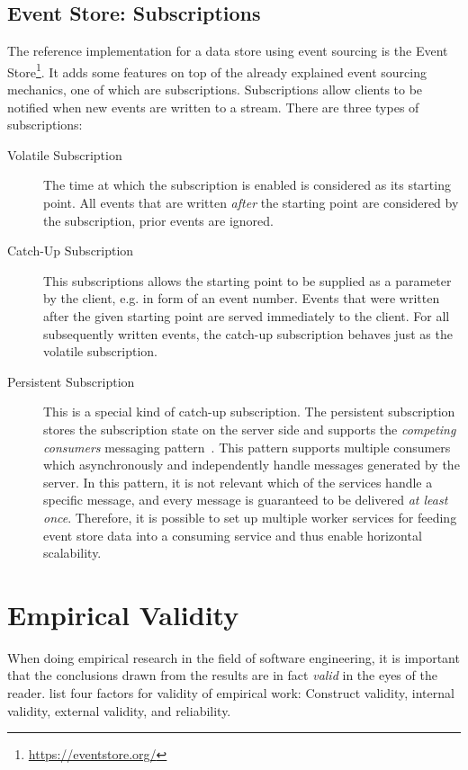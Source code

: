 \subsection{Event Store: Subscriptions}

The reference implementation for a data store using event sourcing is the Event Store\footnote{\url{https://eventstore.org/}}.
It adds some features on top of the already explained event sourcing mechanics, one of which are subscriptions.
Subscriptions allow clients to be notified when new events are written to a stream.
There are three types of subscriptions:

\begin{description}
\item[Volatile Subscription]
The time at which the subscription is enabled is considered as its starting point.
All events that are written \emph{after} the starting point are considered by the subscription, prior events are ignored.
\item[Catch-Up Subscription]
This subscriptions allows the starting point to be supplied as a parameter by the client, e.g. in form of an event number.
Events that were written after the given starting point are served immediately to the client.
For all subsequently written events, the catch-up subscription behaves just as the volatile subscription.
\item[Persistent Subscription] 
This is a special kind of catch-up subscription.
The persistent subscription stores the subscription state on the server side and supports the \emph{competing consumers} messaging pattern~\cite{WEB:Microsoft-Competing-Consumers}.
This pattern supports multiple consumers which asynchronously and independently handle messages generated by the server.
In this pattern, it is not relevant which of the services handle a specific message, and every message is guaranteed to be delivered \emph{at least once}.
Therefore, it is possible to set up multiple worker services for feeding event store data into a consuming service and thus enable horizontal scalability.
\end{description}

\section{Empirical Validity}
\label{sec:fundamentals:evaluation}

When doing empirical research in the field of software engineering, it is important that the conclusions drawn from the results are in fact \emph{valid} in the eyes of the reader.
\citet{Easterbrook2008} list four factors for validity of empirical work: Construct validity, internal validity, external validity, and reliability.

